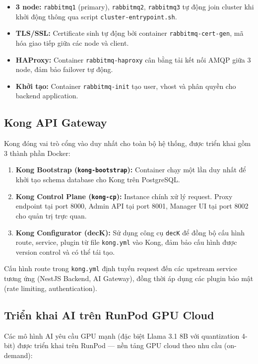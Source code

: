 \begin{itemize}
    \item \textbf{3 node:} \texttt{rabbitmq1} (primary), \texttt{rabbitmq2}, \texttt{rabbitmq3} tự động join cluster khi khởi động thông qua script \texttt{cluster-entrypoint.sh}.
    \item \textbf{TLS/SSL:} Certificate sinh tự động bởi container \texttt{rabbitmq-cert-gen}, mã hóa giao tiếp giữa các node và client.
    \item \textbf{HAProxy:} Container \texttt{rabbitmq-haproxy} cân bằng tải kết nối AMQP giữa 3 node, đảm bảo failover tự động.
    \item \textbf{Khởi tạo:} Container \texttt{rabbitmq-init} tạo user, vhost và phân quyền cho backend application.
\end{itemize}

\subsection{Kong API Gateway}

Kong đóng vai trò cổng vào duy nhất cho toàn bộ hệ thống, được triển khai gồm 3 thành phần Docker:

\begin{enumerate}
    \item \textbf{Kong Bootstrap (\texttt{kong-bootstrap}):} Container chạy một lần duy nhất để khởi tạo schema database cho Kong trên PostgreSQL.
    \item \textbf{Kong Control Plane (\texttt{kong-cp}):} Instance chính xử lý request. Proxy endpoint tại port 8000, Admin API tại port 8001, Manager UI tại port 8002 cho quản trị trực quan.
    \item \textbf{Kong Configurator (decK):} Sử dụng công cụ \texttt{decK} để đồng bộ cấu hình route, service, plugin từ file \texttt{kong.yml} vào Kong, đảm bảo cấu hình được version control và có thể tái tạo.
\end{enumerate}

Cấu hình route trong \texttt{kong.yml} định tuyến request đến các upstream service tương ứng (NestJS Backend, AI Gateway), đồng thời áp dụng các plugin bảo mật (rate limiting, authentication).

\subsection{Triển khai AI trên RunPod GPU Cloud}

Các mô hình AI yêu cầu GPU mạnh (đặc biệt Llama 3.1 8B với quantization 4-bit) được triển khai trên RunPod — nền tảng GPU cloud theo nhu cầu (on-demand):

